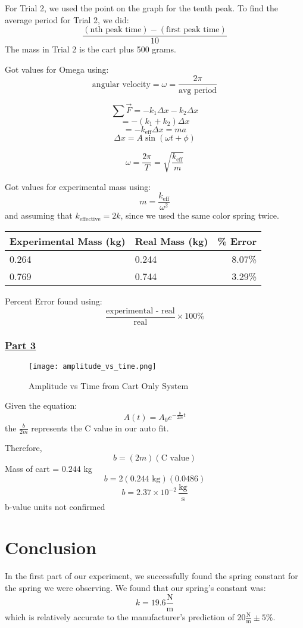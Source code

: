 \documentclass[fleqn]{article}
\begin{document}
For Trial 2, we used the point on the graph for the tenth peak. To find the average period for Trial 2, we did:
\[ \frac{(\text{nth peak time} ) - (\text{first peak time} )}{10} \]
The mass in Trial 2 is the cart plus 500 grams.

Got values for Omega using:
\[\text{angular velocity}=\omega =\frac{2 \pi}{\text{avg period} }\]

\[ \sum \vec{F} = -k_1 \Delta x - k_2 \Delta x \]
\[ = - \left( k_1 + k_2 \right) \Delta x \]
\[ = - k _{\text{eff} } \Delta x = ma  \]
\[ \Delta x = A \sin \left( \omega t + \phi \right) \]

\[ \omega = \frac{2 \pi}{T} = \sqrt{\frac{k _{\text{eff} } }{m} }  \]

Got values for experimental mass using:
\[ m = \frac{k _{\text{eff} } }{\omega ^2}  \]
and assuming that $k _{\text{effective} } = 2k$, since we used the same color spring twice.

\begin{table}[H]
	\setlength{\extrarowheight}{2pt}
	\begin{tabular}{|l|l|r|}
		\hline
		Experimental Mass (kg) & Real Mass (kg) & \% Error \\ \hline
		0.264                  & 0.244          & 8.07\%   \\ \hline
		0.769                  & 0.744          & 3.29\%   \\ \hline
	\end{tabular}
\end{table}
Percent Error found using:
\[ \frac{\text{experimental - real} }{\text{real} } \times 100 \% \]

\subsubsection*{\underline{Part 3}}
\begin{figure}[H]
	\caption*{Amplitude vs Time from Cart Only System}
	\texttt{[image: amplitude\_vs\_time.png]}
\end{figure}
Given the equation:
\[ A(t) = A_0e^{- \frac{b}{2m} t} \]
the $\frac{b}{2m} $ represents the C value in our auto fit.

Therefore,
\[ b = (2m)(\text{C value} ) \]
Mass of cart = $0.244$ kg
\[ b = 2(0.244 \text{ kg} )(0.0486) \]
\[ \boxed{b = 2.37 \times 10^{-2} \,\frac{\text{kg} }{\text{s} } } \]
b-value units not confirmed

\section*{Conclusion}
In the first part of our experiment, we successfully found the spring constant for the spring we were observing. We found that our spring's constant was:
\[ k = 19.6 \frac{\text{N} }{\text{m} }  \]
which is relatively accurate to the manufacturer's prediction of $20 \frac{\text{N} }{\text{m} } \pm 5 \% $.
\end{document}
